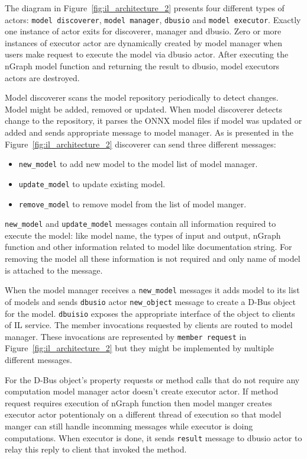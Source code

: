 \documentclass[english, 12pt, a4paper, elec, utf8, online]{aaltothesis}
\begin{document}
The diagram in Figure~\ref{fig:il_architecture_2} presents four different types of actors: \texttt{model discoverer}, \texttt{model manager}, \texttt{dbusio} and \texttt{model executor}. Exactly one instance of actor exits for discoverer, manager and dbusio. Zero or more instances of executor actor are dynamically created by model manager when users make request to execute the model via dbusio actor. After executing the nGraph model function and returning the result to dbusio, model executors actors are destroyed.         

Model discoverer scans the model repository periodically to detect changes. Model might be added, removed or updated. When model discoverer detects change to the repository, it parses the ONNX model files if model was updated or added and sends appropriate message to model manager. As is presented in the Figure~\ref{fig:il_architecture_2} discoverer can send three different messages:
\begin{itemize}
\item \texttt{new\_model} to add new model to the model list of model manager.
\item \texttt{update\_model} to update existing model.
\item \texttt{remove\_model} to remove model from the list of model manger.  
\end{itemize}

\texttt{new\_model} and \texttt{update\_model} messages contain all information required to execute the model: like model name, the types of input and output, nGraph function and other information related to model like documentation string. For removing the model all these information is not required and only name of model is attached to the message. 

When the model manager receives a \texttt{new\_model} messages it adds model to its list of models and sends \texttt{dbusio} actor \texttt{new\_object} message to create a D-Bus object for the model. \texttt{dbuisio} exposes the appropriate interface of the object to clients of IL service. The member invocations requested by clients are routed to model manager. These invocations are represented by \texttt{member request} in Figure~\ref{fig:il_architecture_2} but they might be implemented by multiple different messages. 

For the D-Bus object's property requests or method calls that do not require any computation model manager actor doesn't create executor actor. If method request requires execution of nGraph function then model manger creates executor actor potentionaly on a different thread of execution so that model manger can still handle incomming messages while executor is doing computations. When executor is done, it sends \texttt{result} message to dbusio actor to relay this reply to client that invoked the method.                      
\newpage
\end{document}
